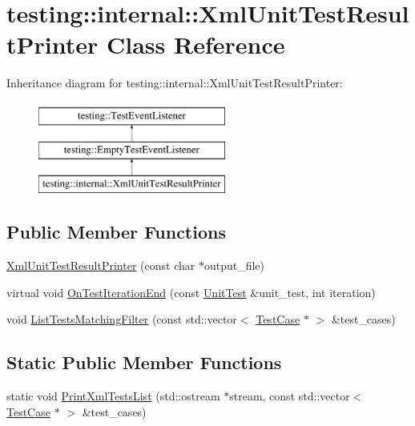 \hypertarget{classtesting_1_1internal_1_1XmlUnitTestResultPrinter}{}\section{testing\+::internal\+::Xml\+Unit\+Test\+Result\+Printer Class Reference}
\label{classtesting_1_1internal_1_1XmlUnitTestResultPrinter}
Inheritance diagram for testing\+::internal\+::Xml\+Unit\+Test\+Result\+Printer\+:\begin{figure}[H]
\begin{center}
\leavevmode
\includegraphics[height=3.000000cm]{classtesting_1_1internal_1_1XmlUnitTestResultPrinter}
\end{center}
\end{figure}
\subsection*{Public Member Functions}
\begin{DoxyCompactItemize}
\item 
\mbox{\hyperlink{classtesting_1_1internal_1_1XmlUnitTestResultPrinter_afdaf88e6764c18ce0dcc3733d7a06e31}{Xml\+Unit\+Test\+Result\+Printer}} (const char $\ast$output\+\_\+file)
\item 
virtual void \mbox{\hyperlink{classtesting_1_1internal_1_1XmlUnitTestResultPrinter_a2ae986dd2f4f2aed31cc6f3bc8c56898}{On\+Test\+Iteration\+End}} (const \mbox{\hyperlink{classtesting_1_1UnitTest}{Unit\+Test}} \&unit\+\_\+test, int iteration)
\item 
void \mbox{\hyperlink{classtesting_1_1internal_1_1XmlUnitTestResultPrinter_acbfdcacec7f668163fa0ccef771f72db}{List\+Tests\+Matching\+Filter}} (const std\+::vector$<$ \mbox{\hyperlink{classtesting_1_1TestCase}{Test\+Case}} $\ast$ $>$ \&test\+\_\+cases)
\end{DoxyCompactItemize}
\subsection*{Static Public Member Functions}
\begin{DoxyCompactItemize}
\item 
static void \mbox{\hyperlink{classtesting_1_1internal_1_1XmlUnitTestResultPrinter_aaefdb155fde088eea18310f23afd2daa}{Print\+Xml\+Tests\+List}} (std\+::ostream $\ast$stream, const std\+::vector$<$ \mbox{\hyperlink{classtesting_1_1TestCase}{Test\+Case}} $\ast$ $>$ \&test\+\_\+cases)
\end{DoxyCompactItemize}


